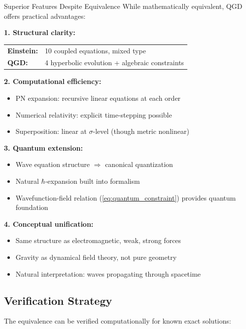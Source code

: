 \documentclass[11pt,a4paper]{article}
\theoremstyle{definition}
\theoremstyle{remark}
\begin{document}
	Superior Features Despite Equivalence
		While mathematically equivalent, QGD offers practical advantages:
		
		\textbf{1. Structural clarity:}
		\begin{center}
			\begin{tabular}{ll}
				\textbf{Einstein:} & 10 coupled equations, mixed type\\
				\textbf{QGD:} & 4 hyperbolic evolution + algebraic constraints\\
			\end{tabular}
		\end{center}
		
		\textbf{2. Computational efficiency:}
		\begin{itemize}
			\item PN expansion: recursive linear equations at each order
			\item Numerical relativity: explicit time-stepping possible
			\item Superposition: linear at $\sigma$-level (though metric nonlinear)
		\end{itemize}
		
		\textbf{3. Quantum extension:}
		\begin{itemize}
			\item Wave equation structure $\Rightarrow$ canonical quantization
			\item Natural $\hbar$-expansion built into formalism
			\item Wavefunction-field relation (\ref{eq:quantum_constraint}) provides quantum foundation
		\end{itemize}
		
		\textbf{4. Conceptual unification:}
		\begin{itemize}
			\item Same structure as electromagnetic, weak, strong forces
			\item Gravity as dynamical field theory, not pure geometry
			\item Natural interpretation: waves propagating through spacetime
		\end{itemize}
	
	\subsection{Verification Strategy}
	
	The equivalence can be verified computationally for known exact solutions:
	
\end{document}
